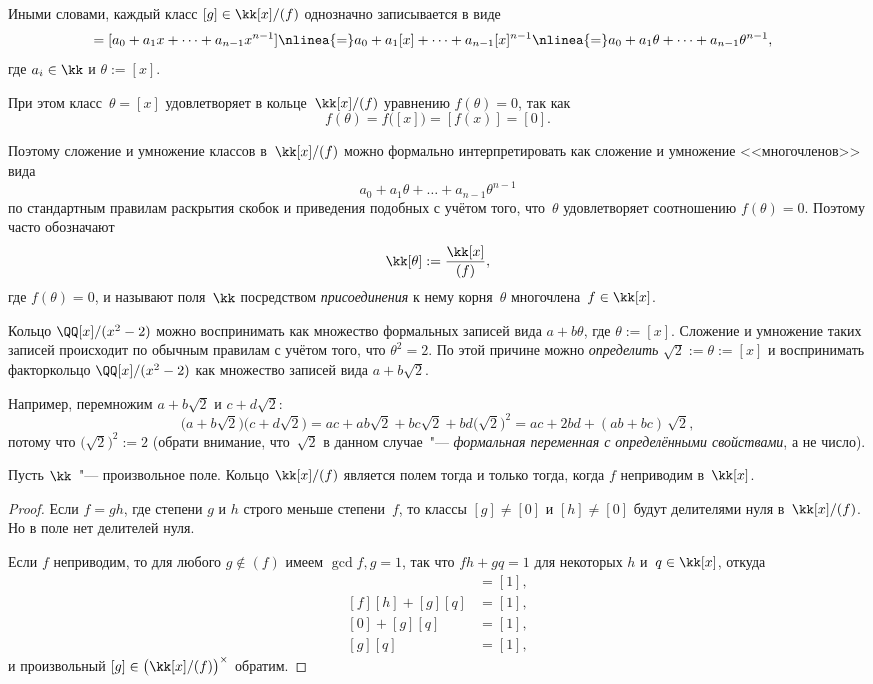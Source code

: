 Иными словами, каждый класс $[g] \in \kk[x]/(f)$ однозначно записывается в виде
\begin{align*}
	[g(x)] &=
	[a_0 + a_1 x + \dots + a_{n-1} x^{n-1}]
	\nlinea{=}
	a_0 + a_1 [x] + \dots + a_{n-1} [x]^{n-1}
	\nlinea{=}
	a_0 + a_1 \theta + \dots + a_{n-1} \theta^{n-1}
	,
\end{align*}
где $a_i \in \kk$ и $\theta := [x]$.

При этом класс~$\theta = [x]$ удовлетворяет в кольце~$\kk[x]/(f)$ уравнению $f(\theta) = 0$, так как
\[
	f(\theta)
	=
	f\bigl( [x] \bigr)
	=
	[f(x)]
	=
	[0]
	.
\]

Поэтому сложение и умножение классов в~$\kk[x]/(f)$ можно формально интерпретировать как сложение и умножение <<многочленов>> вида
\[
	a_0 + a_1 \theta + \dots + a_{n-1} \theta^{n-1}
\]
по стандартным правилам раскрытия скобок и приведения подобных с учётом того, что~$\theta$ удовлетворяет соотношению $f(\theta) = 0$. Поэтому часто обозначают
\[
	\kk[\theta] := \frac{\kk[x]}{(f)},
\]
где $f(\theta) = 0$, и называют  поля~$\kk$ посредством \emph{присоединения} к нему корня~$\theta$ многочлена~$f \in \kk[x]$.

\begin{example}
	Кольцо $\QQ[x]/(x^2 - 2)$ можно воспринимать как множество формальных записей вида $a + b\theta$, где $\theta := [x]$. Сложение и умножение таких записей происходит по обычным правилам с учётом того, что \mbox{$\theta^2 = 2$}. По этой причине можно \emph{определить} $\sqrt{2} := \theta := [x]$ и воспринимать факторкольцо $\QQ[x]/(x^2 - 2)$ как множество записей вида $a + b\sqrt{2}$.

	Например, перемножим $a + b\sqrt{2}$ и $c + d\sqrt{2}$:
	\[
		\bigl(
			a + b\sqrt{2}
		\bigr)
		\bigl(
			c + d\sqrt{2}
		\bigr)
		=
		ac + ab \sqrt{2} + bc \sqrt{2} + bd \bigl( \sqrt{2} \bigr)^2
		=
		ac + 2bd + (ab + bc)\,\sqrt{2},
	\]
	потому что $\bigl( \sqrt{2} \bigr)^2 := 2$ (обрати внимание, что~$\sqrt{2}$ в данном случае~"--- \emph{формальная переменная с определёнными свойствами}, а не число).
\end{example}

\begin{lemma}
	Пусть $\kk$~"--- произвольное поле. Кольцо $\kk[x]/(f)$ является полем тогда и только тогда, когда $f$ неприводим в~$\kk[x]$.
	\label{<+label+>}
\end{lemma}
\begin{proof}
	Если $f = gh$, где степени $g$ и $h$ строго меньше степени~$f$, то классы $[g] \neq [0]$ и $[h] \neq [0]$ будут делителями нуля в~$\kk[x]/(f)$. Но в поле нет делителей нуля.

	Если $f$ неприводим, то для любого $g \notin (f)$ имеем $\gcd{f, g} = 1$, так что $fh + gq = 1$ для некоторых $h$ и~$q \in \kk[x]$, откуда
	\begin{align*}
		[fh + gq] &= [1],
		\\
		[f][h] + [g][q] &= [1],
		\\
		[0] + [g][q] &= [1],
		\\
		[g][q] &= [1],
	\end{align*}
	и произвольный
	$
		[g] \in
		\bigl( \kk[x]/(f) \bigr)
		^\times
	$ обратим.
\end{proof}

